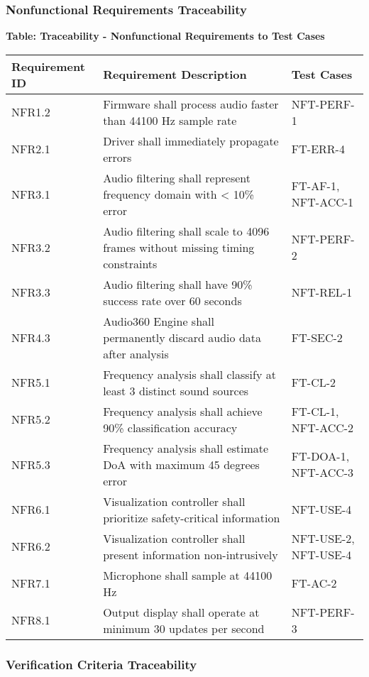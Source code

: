 \documentclass[12pt, titlepage]{article}
\begin{document}
\subsubsection{Nonfunctional Requirements Traceability}

\noindent
\textbf{Table: Traceability - Nonfunctional Requirements to Test Cases}

\noindent
\begin{tabular}{|p{3cm}|p{8cm}|p{3cm}|}
\hline
\textbf{Requirement ID} & \textbf{Requirement Description} & \textbf{Test Cases} \\
\hline
NFR1.2 & Firmware shall process audio faster than 44100 Hz sample rate & NFT-PERF-1 \\
\hline
NFR2.1 & Driver shall immediately propagate errors & FT-ERR-4 \\
\hline
NFR3.1 & Audio filtering shall represent frequency domain with < 10\% error & FT-AF-1, NFT-ACC-1 \\
\hline
NFR3.2 & Audio filtering shall scale to 4096 frames without missing timing constraints & NFT-PERF-2 \\
\hline
NFR3.3 & Audio filtering shall have 90\% success rate over 60 seconds & NFT-REL-1 \\
\hline
NFR4.3 & Audio360 Engine shall permanently discard audio data after analysis & FT-SEC-2 \\
\hline
NFR5.1 & Frequency analysis shall classify at least 3 distinct sound sources & FT-CL-2 \\
\hline
NFR5.2 & Frequency analysis shall achieve 90\% classification accuracy & FT-CL-1, NFT-ACC-2 \\
\hline
NFR5.3 & Frequency analysis shall estimate DoA with maximum 45 degrees error & FT-DOA-1, NFT-ACC-3 \\
\hline
NFR6.1 & Visualization controller shall prioritize safety-critical information & NFT-USE-4 \\
\hline
NFR6.2 & Visualization controller shall present information non-intrusively & NFT-USE-2, NFT-USE-4 \\
\hline
NFR7.1 & Microphone shall sample at 44100 Hz & FT-AC-2 \\
\hline
NFR8.1 & Output display shall operate at minimum 30 updates per second & NFT-PERF-3 \\
\hline
\end{tabular}

\subsubsection{Verification Criteria Traceability}
\end{document}
